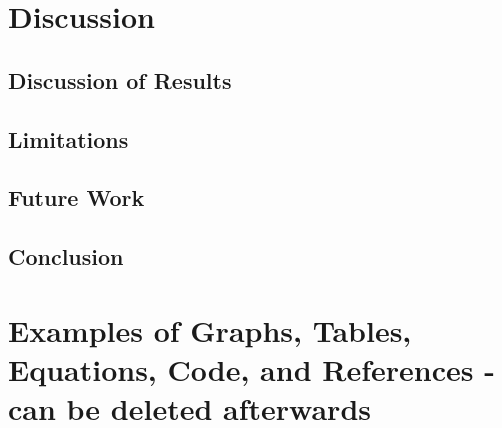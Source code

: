 \documentclass[12pt]{article}
\begin{document}
\begin{spacing}{1.5}
\newpage
\section{Discussion}


\subsection{Discussion of Results}


\subsection{Limitations}


\subsection{Future Work}


\subsection{Conclusion}




\newpage
\section{Examples of Graphs, Tables, Equations, Code, and References - can be deleted afterwards}



\newpage
{}




\end{spacing}
\end{document}
